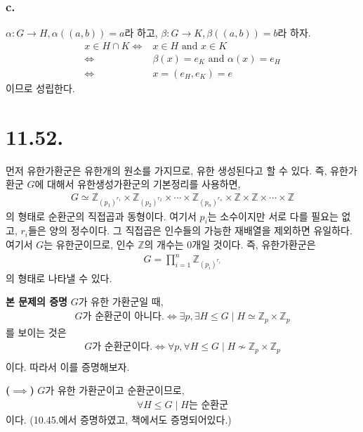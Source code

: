 \documentclass{article}
\begin{document}
\subsubsection{c.}
$\alpha : G \rightarrow H, \alpha\left( (a, b) \right) = a$라 하고, $\beta : G \rightarrow K, \beta \left( (a, b) \right) = b$라 하자.
\begin{align*}
x \in H \cap K \iff& x \in H \text{ and } x \in K
\\ \iff& \beta(x) = e_K \text{ and } \alpha(x) = e_H
\\ \iff& x = (e_H, e_K) = e
\end{align*}이므로 성립한다.

\section{11.52.}
먼저 유한가환군은 유한개의 원소를 가지므로, 유한 생성된다고 할 수 있다. 즉, 유한가환군 $G$에 대해서 유한생성가환군의 기본정리를 사용하면,
\begin{align*}
G \simeq \mathbb{Z}_{ \left(p_1\right)^{r_1}} \times \mathbb{Z}_{ \left(p_2\right)^{r_2}} \times \cdots \times \mathbb{Z}_{ \left(p_n\right)^{r_n}} \times \mathbb{Z} \times \mathbb{Z} \times \cdots \times \mathbb{Z}
\end{align*}의 형태로 순환군의 직접곱과 동형이다. 여기서 $p_i$는 소수이지만 서로 다를 필요는 없고, $r_i$들은 양의 정수이다. 그 직접곱은 인수들의 가능한 재배열을 제외하면 유일하다. 여기서 $G$는 유한군이므로, 인수 $\mathbb{Z}$의 개수는 0개일 것이다. 즉, 유한가환군은 
\begin{align*}
G = \prod_{i=1}^{n}\mathbb{Z}_{ \left(p_i\right)^{r_i}} \tag{$p_i$는 소수, $r_i$는 양의 정수}
\end{align*}의 형태로 나타낼 수 있다.

\textbf{본 문제의 증명} $G$가 유한 가환군일 때,
\begin{align*}
G\text{가 순환군이 아니다.} \iff \exists p, \exists H \le G \mid H \simeq \mathbb{Z}_p \times \mathbb{Z}_p
\end{align*}를 보이는 것은 
\begin{align*}
G\text{가 순환군이다.} \iff \forall p, \forall H \le G \mid H \nsim \mathbb{Z}_p \times \mathbb{Z}_p
\\ \tag{$\nsim$은 "동형이 아니다"를 의미한다.}
\end{align*}이다. 따라서 이를 증명해보자.

\textbf{($\implies$)} $G$가 유한 가환군이고 순환군이므로, 
\begin{align*}
\forall H \le G \mid H \text{는 순환군}
\end{align*}이다. (10.45.에서 증명하였고, 책에서도 증명되어있다.)
\end{document}
